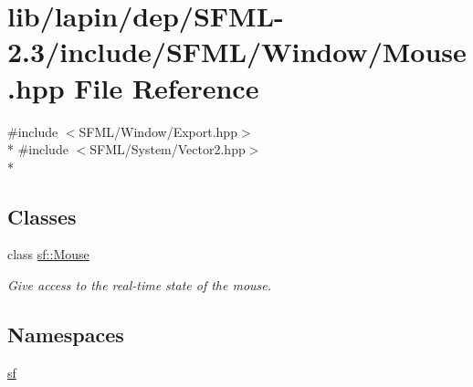 \hypertarget{lapin_2dep_2_s_f_m_l-2_83_2include_2_s_f_m_l_2_window_2_mouse_8hpp}{\section{lib/lapin/dep/\-S\-F\-M\-L-\/2.3/include/\-S\-F\-M\-L/\-Window/\-Mouse.hpp File Reference}
\label{lapin_2dep_2_s_f_m_l-2_83_2include_2_s_f_m_l_2_window_2_mouse_8hpp}
}
{\ttfamily \#include $<$S\-F\-M\-L/\-Window/\-Export.\-hpp$>$}\\*
{\ttfamily \#include $<$S\-F\-M\-L/\-System/\-Vector2.\-hpp$>$}\\*
\subsection*{Classes}
\begin{DoxyCompactItemize}
\item 
class \hyperlink{classsf_1_1_mouse}{sf\-::\-Mouse}
\begin{DoxyCompactList}\small\item\em Give access to the real-\/time state of the mouse. \end{DoxyCompactList}\end{DoxyCompactItemize}
\subsection*{Namespaces}
\begin{DoxyCompactItemize}
\item 
\hyperlink{namespacesf}{sf}
\end{DoxyCompactItemize}
